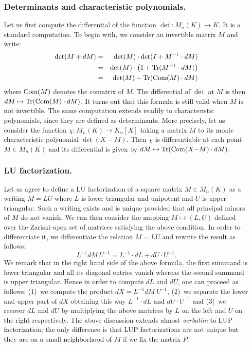 \documentclass{lms}
\begin{document}
\subsubsection*{Determinants and characteristic polynomials.}

Let us first compute the differential of the function $\det : M_n(K) \to 
K$. It is a standard computation. To begin with, we consider an 
invertible matrix $M$ and write:
\begin{eqnarray*}
\det(M + dM) &=& \det(M) \cdot \det(I + M^{-1} \cdot dM)  \\
&=& \det(M) \cdot \big(1 + \text{\rm Tr}(M^{-1} \cdot dM)\big) \\
&=& \det(M) + \text{\rm Tr}(\text{\rm Com}(M) \cdot dM)
\end{eqnarray*}
where $\text{\rm Com}(M)$ denotes the comatrix of $M$. The differential of 
$\det$ at $M$ is then $dM \mapsto \text{\rm Tr}(\text{\rm Com}(M) \cdot dM)$. It turns
out that this formula is still valid when $M$ is not invertible.
The same computation extends readily to characteristic polynomials,
since they are defined as determinants. More precisely, let us 
consider the function $\chi : M_n(K) \to K_n[X]$ taking a matrix 
$M$ to its monic characteristic polynomial $\det(X-M)$.
Then $\chi$ is differentiable at each point $M \in M_n(K)$ and its 
differential is given by $dM \mapsto \text{\rm Tr}(\text{\rm Com}(X{-}M) \cdot dM)$.

\subsubsection*{LU factorization.}

Let us agree to define a 
LU factorization of a square matrix $M \in M_n(K)$ as a writing $M = LU$ 
where $L$ is lower triangular and unipotent and $U$ is upper triangular. 
Such a writing exists and is unique provided that all principal minors 
of $M$ do not vanish. We can then consider the mapping $M \mapsto (L,U)$ 
defined over the Zariski-open set of matrices satisfying the above 
condition. In order to differentiate it, we differentiate the relation 
$M = LU$ and rewrite the result as follows:
$$L^{-1} dM \: U^{-1} = L^{-1} \cdot dL + dU \cdot U^{-1}.$$
We remark that in the right hand side of the above formula, the first
summand is lower triangular and all its diagonal entries vanish whereas 
the second summand is upper triangular. Hence in order to compute $dL$
and $dU$, one can proceed as follows: (1)~we compute the product $dX = 
L^{-1} dM \: U^{-1}$, (2)~we separate the lower and upper part of $dX$
obtaining this way $L^{-1} \cdot dL$ and $dU \cdot U^{-1}$ and (3)~we
recover $dL$ and $dU$ by multiplying the above matrices by $L$ on the 
left and $U$ on the right respectively. 
The above discussion extends almost \emph{verbatim} to LUP 
factorization; the only difference is that LUP factorizations are not 
unique but they are on a small neighborhood of $M$ if we fix the matrix 
$P$.
\end{document}
